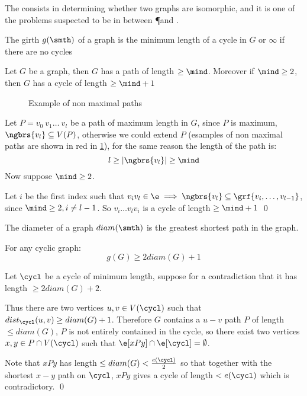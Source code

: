 \begin{coolfact}
    The  consists in determining whether two graphs are isomorphic, and it is one of the problems suspected to be in between \P and \NP.
\end{coolfact}
\begin{definition}[Girth]
    The girth $g(\smth)$ of a graph is the minimum length of a cycle in $G$ or $\infty$ if there are no cycles
\end{definition}
\begin{customproposition}{1.6}
    \label{proposition:1.6}
    Let $G$ be a graph, then $G$ has a path of length $\geq \mind$. Moreover if $\mind \geq 2$, then $G$ has a cycle of length $\geq \mind + 1$
\end{customproposition}
\begin{prf}
    \begin{figure}[h]
        \centering
        
        \caption{Example of non maximal paths}
        \label{fig:proposition1.6}
    \end{figure}
    Let $P = v_0\:v_1\dots\:v_l$ be a path of maximum length in $G$, since $P$ is maximum, $\ngbrs{v_l} \subseteq V(P)$, otherwise we could extend $P$ (esamples of non maximal paths are shown in red in \ref{fig:proposition1.6}), for the same reason the length of the path is:
    \begin{equation*}
        l \geq |\ngbrs{v_l}| \geq \mind
    \end{equation*}
    Now suppose $\mind \geq 2$.

    Let $i$ be the first index such that $v_iv_l \in \e \implies \ngbrs{v_l} \subseteq \grf{v_i, \dots, v_{l - 1}}$, since $\mind \geq 2, i \neq l - 1$. So $v_i \dots v_lv_i$ is a cycle of length $\geq \mind + 1$ \qed
\end{prf}
\begin{definition}[Diameter]
    The diameter of a graph $diam(\smth)$ is the greatest shortest path in the graph.
\end{definition}
\begin{customproposition}{1.7}
    \label{proposition:1.7}
    For any cyclic graph:
    \begin{equation*}
        g(G) \geq 2diam(G) + 1
    \end{equation*}
\end{customproposition}
\begin{prf}
    Let $\cycl$ be a cycle of minimum length, suppose for a contradiction that it has length $\geq 2diam(G) + 2$.

    Thus there are two vertices $u, v \in V(\cycl)$ such that $dist_{\cycl}(u, v) \geq diam(G) + 1$. Therefore $G$ contains a $u - v$ path $P$ of length $\leq diam(G)$, $P$ is not entirely contained in the cycle, so there exist two vertices $x, y \in P \cap V(\cycl)$ such that $\e[xPy] \cap \e[\cycl] = \emptyset$.

    Note that $xPy$ has length $\leq diam(G) < \frac{e(\cycl)}{2}$ so that together with the shortest $x - y$ path on $\cycl$, $xPy$ gives a cycle of length $< e(\cycl)$ which is contradictory. \qed
\end{prf}
